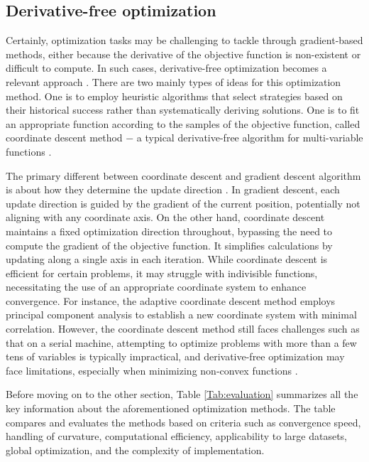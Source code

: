 \documentclass[12pt,a4paper]{article}
\begin{document}
\subsection{Derivative-free optimization}
Certainly, optimization tasks may be challenging to tackle through gradient-based methods, either because the derivative of the objective function is non-existent or difficult to compute. In such cases, derivative-free optimization becomes a relevant approach \cite{optimization}. There are two mainly types of ideas for this optimization method. One is to employ heuristic algorithms that select strategies based on their historical success rather than systematically deriving solutions. One is to fit an appropriate function according to the samples of the objective function, called coordinate descent method $-$ a typical derivative-free algorithm for multi-variable functions \cite{optimization}. 

The primary different between coordinate descent and gradient descent algorithm is about how they determine the update direction \cite{optimization}. In gradient descent, each update direction is guided by the gradient of the current position, potentially not aligning with any coordinate axis. On the other hand, coordinate descent maintains a fixed optimization direction throughout, bypassing the need to compute the gradient of the objective function. It simplifies calculations by updating along a single axis in each iteration. While coordinate descent is efficient for certain problems, it may struggle with indivisible functions, necessitating the use of an appropriate coordinate system to enhance convergence. For instance, the adaptive coordinate descent method employs principal component analysis to establish a new coordinate system with minimal correlation. However, the coordinate descent method still faces challenges such as that on a serial machine, attempting to optimize problems with more than a few tens of variables is typically impractical, and derivative-free optimization may face limitations, especially when minimizing non-convex functions \cite{derivative-free}.

Before moving on to the other section, Table \ref{Tab:evaluation} summarizes all the key information about the aforementioned optimization methods. The table compares and evaluates the methods based on criteria such as convergence speed, handling of curvature, computational efficiency, applicability to large datasets, global optimization, and the complexity of implementation.
\end{document}
